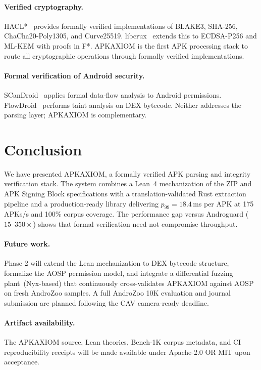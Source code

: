 \documentclass[runningheads]{llncs}
\begin{document}
\paragraph{Verified cryptography.}
HACL*~\cite{hacl} provides formally verified implementations of BLAKE3,
SHA-256, ChaCha20-Poly1305, and Curve25519.  libcrux~\cite{libcrux} extends
this to ECDSA-P256 and ML-KEM with proofs in F*.  APKAXIOM is the first APK
processing stack to route all cryptographic operations through formally verified
implementations.

\paragraph{Formal verification of Android security.}
SCanDroid~\cite{scandroid} applies formal data-flow analysis to Android
permissions.  FlowDroid~\cite{flowdroid} performs taint analysis on DEX
bytecode.  Neither addresses the parsing layer; APKAXIOM is complementary.

\section{Conclusion}
\label{sec:conclusion}

We have presented APKAXIOM, a formally verified APK parsing and integrity
verification stack.  The system combines a Lean~4 mechanization of the ZIP and
APK Signing Block specifications with a translation-validated Rust extraction
pipeline and a production-ready library delivering $p_{99} = 18.4$\,ms per
APK at 175 APKs/s and 100\% corpus coverage.  The performance gap versus
Androguard ($15\text{--}350\times$) shows that formal verification need not
compromise throughput.

\paragraph{Future work.}
Phase 2 will extend the Lean mechanization to DEX bytecode structure,
formalize the AOSP permission model, and integrate a differential fuzzing
plant~(Nyx-based) that continuously cross-validates APKAXIOM against AOSP
on fresh AndroZoo samples.  A full AndroZoo 10K evaluation and journal
submission are planned following the CAV camera-ready deadline.

\paragraph{Artifact availability.}
The APKAXIOM source, Lean theories, Bench-1K corpus metadata, and CI
reproducibility receipts will be made available under Apache-2.0 OR MIT
upon acceptance.
\end{document}
